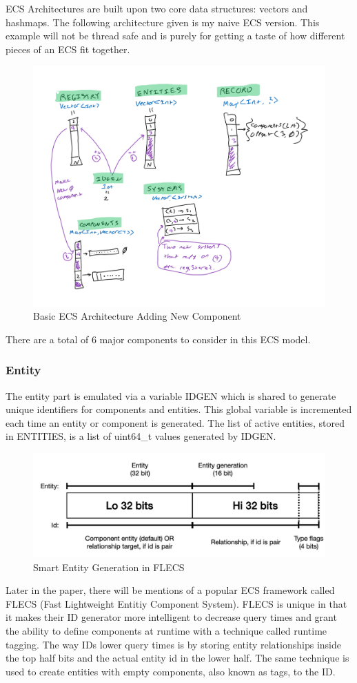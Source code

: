 ECS Architectures are built upon two core data structures: vectors and hashmaps. The following architecture given is my naive ECS version. This example will not be thread safe and is purely for getting a taste of how different pieces of an ECS fit together.

\begin{figure}[htbp]
    \centering
    \includegraphics[width=0.5\linewidth]{resources/naive_ecs.png}
    \caption{Basic ECS Architecture Adding New Component}
    \label{fig:naive_ecs}
\end{figure}


There are a total of 6 major components to consider in this ECS model. 

\subsubsection{Entity}
The entity part is emulated via a variable IDGEN which is shared to generate unique identifiers for components and entities. This global variable is incremented each time an entity or component is generated. The list of active entities, stored in ENTITIES, is a list of uint64\_t values generated by IDGEN. 

\begin{figure}[H]
    \centering
    \includegraphics[width=0.5\linewidth]{resources/entity_generation.png}
    \caption{Smart Entity Generation in FLECS}
    \label{fig:entity_generation}
\end{figure}

Later in the paper, there will be mentions of a popular ECS framework called FLECS \textnormal{(Fast Lightweight Entitiy Component System)}. FLECS is unique in that it makes their ID generator more intelligent to decrease query times and grant the ability to define components at runtime with a technique called runtime tagging. The way IDs lower query times is by storing entity relationships inside the top half bits and the actual entity id in the lower half. The same technique is used to create entities with empty components, also known as tags, to the ID.  

